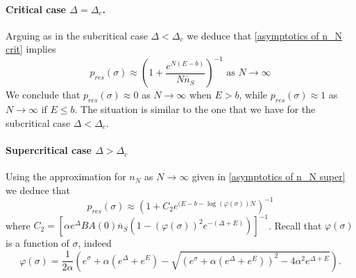 \documentclass{article}
\numberwithin{equation}{section}
\theoremstyle{plain}
\begin{document}
\paragraph{Critical case $\Delta = \Delta_c$.}

Arguing as in the subcritical case $\Delta < \Delta_c$ we deduce that \eqref{asymptotics of n_N crit} implies 
\[
p_{res} (\sigma) \approx  \left( 1 + \frac{e^{N(E-b)}}{ N \overline n_S } \right)^{-1} \text { as } N \to \infty
\] 
We conclude that $p_{res} (\sigma) \approx 0 $ as $N \to \infty $ when $E>b $, while $p_{res} (\sigma) \approx 1 $ as $N \to \infty $ if $E \leq b $.
The situation is similar to the one that we have for the subcritical case $\Delta < \Delta_c $. 

\paragraph{Supercritical case $\Delta > \Delta_c$}

Using the approximation for $n_{N} $ as $N \to \infty $ given in \eqref{asymptotics of n_N super} we deduce that
\begin{equation}\label{formal p super}
p_{res} (\sigma)  \approx \left( 1+C_2 e^{(E -b- \log(\varphi(\sigma) ) N }\right)^{-1}
\end{equation}
where $C_2= \left[ \alpha e^\Delta B A(0) \overline n_S \left( 1- (\varphi(\sigma))^2 e^{ - (\Delta + E) } \right)  \right]^{-1} $. 
Recall that $\varphi(\sigma) $ is a function of $\sigma $, indeed 
\[ 
\varphi(\sigma)= \frac{1}{2 \alpha } \left(  e^\sigma + \alpha (e^\Delta + e^E)  -  \sqrt{(e^\sigma + \alpha (e^\Delta + e^E) )^2 - 4 \alpha^2  e^{\Delta + E} } \right). 
\]
\end{document}
